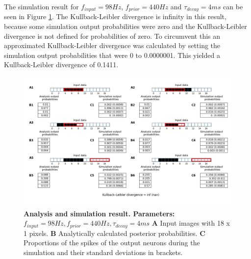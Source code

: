 The simulation result for $f_{input} = 98 Hz$, $f_{prior} = 440 Hz$ and $\tau_{decay} = 4 ms$ can be seen in Figure \ref{fig:doubleSize_98_440_4}. The Kullback-Leibler divergence is infinity in this result, because some simulation output probabilities were zero and the Kullback-Leibler divergence is not defined for probabilities of zero. To circumvent this an approximated Kullback-Leibler divergence was calculated by setting the simulation output probabilities that were 0 to 0.0000001. This yielded a Kullback-Leibler divergence of 0.1411.
\begin{figure}
  \includegraphics[width=\linewidth]{figures/1D/doubleSize/doubleSize_98_440_4.png}
  \caption{\textbf{Analysis and simulation result. Parameters: } $f_{input} = 98 Hz, f_{prior} = 440 Hz, \tau_{decay} = 4 ms$ \textbf{A} Input images with 18 x 1 pixels. \textbf{B} Analytically calculated posterior probabilities. \textbf{C} Proportions of the spikes of the output neurons during the simulation and their standard deviations in brackets.}
  \label{fig:doubleSize_98_440_4}
\end{figure}

